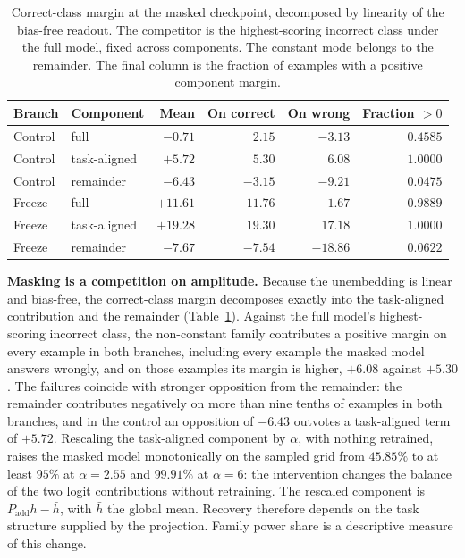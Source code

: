 \begin{table}[!htbp]
\centering
\caption{Correct-class margin at the masked checkpoint, decomposed by linearity of the bias-free readout. The competitor is the highest-scoring incorrect class under the full model, fixed across components. The constant mode belongs to the remainder. The final column is the fraction of examples with a positive component margin.}
\label{tab:margins}
\begin{tabular}{llrrrr}
\toprule
Branch & Component & Mean & On correct & On wrong & Fraction $>0$ \\
\midrule
Control & full & $-0.71$ & $2.15$ & $-3.13$ & $0.4585$ \\
Control & task-aligned & $+5.72$ & $5.30$ & $6.08$ & $1.0000$ \\
Control & remainder & $-6.43$ & $-3.15$ & $-9.21$ & $0.0475$ \\
\midrule
Freeze & full & $+11.61$ & $11.76$ & $-1.67$ & $0.9889$ \\
Freeze & task-aligned & $+19.28$ & $19.30$ & $17.18$ & $1.0000$ \\
Freeze & remainder & $-7.67$ & $-7.54$ & $-18.86$ & $0.0622$ \\
\bottomrule
\end{tabular}
\end{table}

\textbf{Masking is a competition on amplitude.} Because the unembedding is linear and bias-free, the correct-class margin decomposes exactly into the task-aligned contribution and the remainder (Table~\ref{tab:margins}). Against the full model's highest-scoring incorrect class, the non-constant family contributes a positive margin on every example in both branches, including every example the masked model answers wrongly, and on those examples its margin is higher, $+6.08$ against $+5.30$. The failures coincide with stronger opposition from the remainder: the remainder contributes negatively on more than nine tenths of examples in both branches, and in the control an opposition of $-6.43$ outvotes a task-aligned term of $+5.72$. Rescaling the task-aligned component by $\alpha$, with nothing retrained, raises the masked model monotonically on the sampled grid from $45.85\%$ to at least $95\%$ at $\alpha=2.55$ and $99.91\%$ at $\alpha=6$: the intervention changes the balance of the two logit contributions without retraining. The rescaled component is $P_{\mathrm{add}}h-\bar h$, with $\bar h$ the global mean. Recovery therefore depends on the task structure supplied by the projection. Family power share is a descriptive measure of this change.

